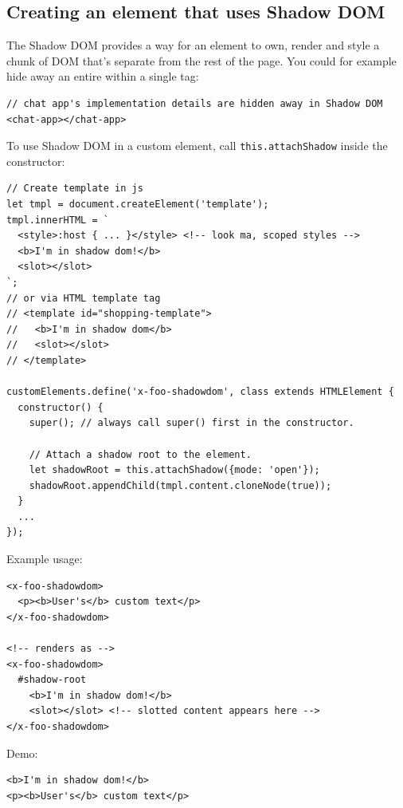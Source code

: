 \documentclass[11pt]{article}
\begin{document}
\subsection{Creating an element that uses Shadow DOM}
\label{sec:org3779d56}
The Shadow DOM provides a way for an element to own, render and style a chunk of DOM that's separate from the rest of the page. You could for example hide away an entire within a single tag:
\lstset{breaklines=true,language=js,label= ,caption= ,captionpos=b,numbers=none}
\begin{lstlisting}
// chat app's implementation details are hidden away in Shadow DOM
<chat-app></chat-app>
\end{lstlisting}
To use Shadow DOM in a custom element, call \texttt{this.attachShadow} inside the constructor:
\lstset{breaklines=true,language=js,label= ,caption= ,captionpos=b,numbers=none}
\begin{lstlisting}
// Create template in js
let tmpl = document.createElement('template'); 
tmpl.innerHTML = `
  <style>:host { ... }</style> <!-- look ma, scoped styles -->
  <b>I'm in shadow dom!</b>
  <slot></slot>
`;
// or via HTML template tag
// <template id="shopping-template">
//   <b>I'm in shadow dom</b>
//   <slot></slot>
// </template>

customElements.define('x-foo-shadowdom', class extends HTMLElement {
  constructor() {
    super(); // always call super() first in the constructor.

    // Attach a shadow root to the element.
    let shadowRoot = this.attachShadow({mode: 'open'});
    shadowRoot.appendChild(tmpl.content.cloneNode(true));
  }
  ...
});
\end{lstlisting}
Example usage:
\lstset{breaklines=true,language=js,label= ,caption= ,captionpos=b,numbers=none}
\begin{lstlisting}
<x-foo-shadowdom>
  <p><b>User's</b> custom text</p>
</x-foo-shadowdom>

<!-- renders as -->
<x-foo-shadowdom>
  #shadow-root
    <b>I'm in shadow dom!</b>
    <slot></slot> <!-- slotted content appears here -->
</x-foo-shadowdom>
\end{lstlisting}
Demo:
\lstset{breaklines=true,language=HTML,label= ,caption= ,captionpos=b,numbers=none}
\begin{lstlisting}
<b>I'm in shadow dom!</b>
<p><b>User's</b> custom text</p>
\end{lstlisting}
\end{document}

